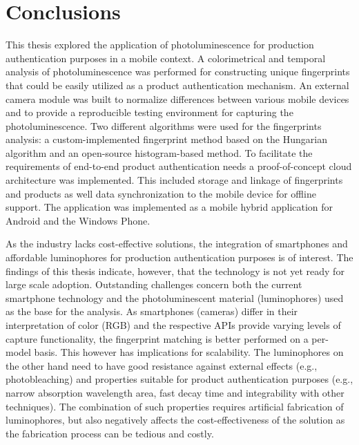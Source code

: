 \documentclass[thesis.tex]{subfiles}
\begin{document}
\chapter{Conclusions}
\label{chapter:conclusions}

This thesis explored the application of photoluminescence for production authentication purposes in a mobile context. A colorimetrical and temporal analysis of photoluminescence was performed for constructing unique fingerprints that could be easily utilized as a product authentication mechanism. An external camera module was built to normalize differences between various mobile devices and to provide a reproducible testing environment for capturing the photoluminescence. Two different algorithms were used for the fingerprints analysis: a custom-implemented fingerprint method based on the Hungarian algorithm and an open-source histogram-based method. To facilitate the requirements of end-to-end product authentication needs a proof-of-concept cloud architecture was implemented. This included storage and linkage of fingerprints and products as well data synchronization to the mobile device for offline support. The application was implemented as a mobile hybrid application for Android and the Windows Phone.

As the industry lacks cost-effective solutions, the integration of smartphones and affordable luminophores for production authentication purposes is of interest. The findings of this thesis indicate, however, that the technology is not yet ready for large scale adoption. Outstanding challenges concern both the current smartphone technology and the photoluminescent material (luminophores) used as the base for the analysis. As smartphones (cameras) differ in their interpretation of color (RGB) and the respective APIs provide varying levels of capture functionality, the fingerprint matching is better performed on a per-model basis. This however has implications for scalability. The luminophores on the other hand need to have good resistance against external effects (e.g., photobleaching) and properties suitable for product authentication purposes (e.g., narrow absorption wavelength area, fast decay time and integrability with other techniques). The combination of such properties requires artificial fabrication of luminophores, but also negatively affects the cost-effectiveness of the solution as the fabrication process can be tedious and costly.
\end{document}
